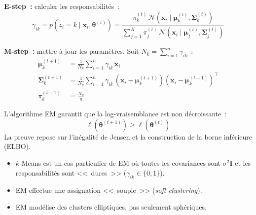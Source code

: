 \begin{formules}[title=\textbf{Algorithme EM pour GMM}]
\textbf{E-step~:} calculer les responsabilit\'es~:
\begin{equation}
  \gamma_{ik} = p(z_i = k \mid \bm{x}_i, \bm{\theta}^{(t)}) =
  \frac{\pi_k^{(t)} \, \mathcal{N}(\bm{x}_i \mid \bm{\mu}_k^{(t)},
  \bm{\Sigma}_k^{(t)})}{\sum_{j=1}^K \pi_j^{(t)} \,
  \mathcal{N}(\bm{x}_i \mid \bm{\mu}_j^{(t)}, \bm{\Sigma}_j^{(t)})}
  \label{eq:e-step}
\end{equation}

\textbf{M-step~:} mettre \`a jour les param\`etres. Soit $N_k = \sum_{i=1}^n
\gamma_{ik}$~:
\begin{align}
  \bm{\mu}_k^{(t+1)} &= \frac{1}{N_k} \sum_{i=1}^n \gamma_{ik}\, \bm{x}_i
  \label{eq:m-step-mu} \\
  \bm{\Sigma}_k^{(t+1)} &= \frac{1}{N_k} \sum_{i=1}^n \gamma_{ik}\,
  (\bm{x}_i - \bm{\mu}_k^{(t+1)})(\bm{x}_i - \bm{\mu}_k^{(t+1)})^\top
  \label{eq:m-step-sigma} \\
  \pi_k^{(t+1)} &= \frac{N_k}{n}
  \label{eq:m-step-pi}
\end{align}
\end{formules}

\begin{theoreme}[Monotonie de EM]
L'algorithme EM garantit que la log-vraisemblance est non d\'ecroissante~:
\begin{equation}
  \ell(\bm{\theta}^{(t+1)}) \geq \ell(\bm{\theta}^{(t)})
\end{equation}
La preuve repose sur l'in\'egalit\'e de Jensen et la construction de la borne
inf\'erieure (ELBO).
\end{theoreme}

\begin{intuition}[title=\textbf{EM vs $k$-Means}]
\begin{itemize}
  \item $k$-Means est un cas particulier de EM o\`u toutes les covariances sont
    $\sigma^2 \bm{I}$ et les responsabilit\'es sont <<~dures~>> ($\gamma_{ik}
    \in \{0,1\}$).
  \item EM effectue une assignation <<~souple~>> (\emph{soft clustering}).
  \item EM mod\'elise des clusters elliptiques, pas seulement sph\'eriques.
\end{itemize}
\end{intuition}


